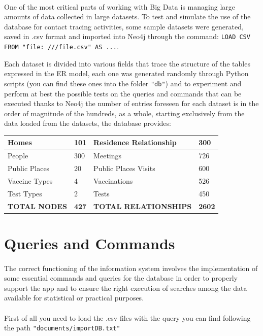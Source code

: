 \documentclass[a4paper,12pt]{article}
\begin{document}
\paragraph{} One of the most critical parts of working with Big Data is managing large amounts of data collected in large datasets. To test and simulate the use of the database for contact tracing activities, some sample datasets were generated, saved in .csv format and imported into Neo4j through the command: \texttt{LOAD CSV FROM "file: ///file.csv" AS ...}. \par
Each dataset is divided into various fields that trace the structure of the tables expressed in the ER model, each one was generated randomly through Python scripts (you can find these ones into the folder \texttt{"db"}) and to experiment and perform at best the possible tests on the queries and commands that can be executed thanks to Neo4j the number of entries foreseen for each dataset is in the order of magnitude of the hundreds, as a whole, starting exclusively from the data loaded from the datasets, the database provides:
\begin{center}
\begin{tabular}{|l|l|l|l|}
\hline
Homes & 101 & Residence Relationship & 300 \\
\hline
People & 300 & Meetings & 726 \\
\hline
Public Places & 20 & Public Places Visits & 600 \\
\hline
Vaccine Types & 4 & Vaccinations & 526 \\
\hline
Test Types & 2 & Tests & 450\\
\hline
\textbf{TOTAL NODES} & \textbf{427} & \textbf{TOTAL RELATIONSHIPS} & \textbf{2602}\\
\hline
\end{tabular}
\end{center}
\section{Queries and Commands}
\paragraph{} The correct functioning of the information system involves the implementation of some essential commands and queries for the database in order to properly support the app and to ensure the right execution of searches among the data available for statistical or practical purposes. \par
\paragraph{} First of all you need to load the .csv files with the query you can find following the path \texttt{"documents/importDB.txt"}
\end{document}
